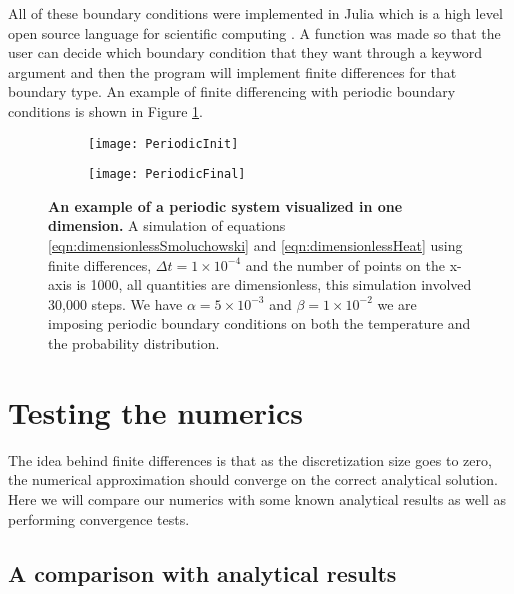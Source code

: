 All of these boundary conditions were implemented in Julia which is a high level open source language for scientific computing \cite{Bezanson2014}. A function was made so that the user can decide which boundary condition that they want through a keyword argument and then the program will implement finite differences for that boundary type. An example of finite differencing with periodic boundary conditions is shown in Figure \ref{fig:periodicSimulation}.
\begin{figure}
	\begin{subfigure}{0.49\textwidth}
		\texttt{[image: PeriodicInit]}
	\end{subfigure}
	\begin{subfigure}{0.49\textwidth}
		\texttt{[image: PeriodicFinal]}
	\end{subfigure}
	\caption{\textbf{An example of a periodic system visualized in one dimension.} A simulation of equations \ref{eqn:dimensionlessSmoluchowski} and \ref{eqn:dimensionlessHeat} using finite differences, $\Delta t = 1 \times 10^{-4}$ and the number of points on the x-axis is 1000, all quantities are dimensionless, this simulation involved 30,000 steps. We have $\alpha = 5 \times 10^{-3}$ and $\beta = 1 \times 10^{-2}$ we are imposing periodic boundary conditions on both the temperature and the probability distribution. \label{fig:periodicSimulation}}
\end{figure}

\section{Testing the numerics}

The idea behind finite differences is that as the discretization size goes to zero, the numerical approximation should converge on the correct analytical solution. Here we will compare our numerics with some known analytical results as well as performing convergence tests.
\subsection{A comparison with analytical results}

